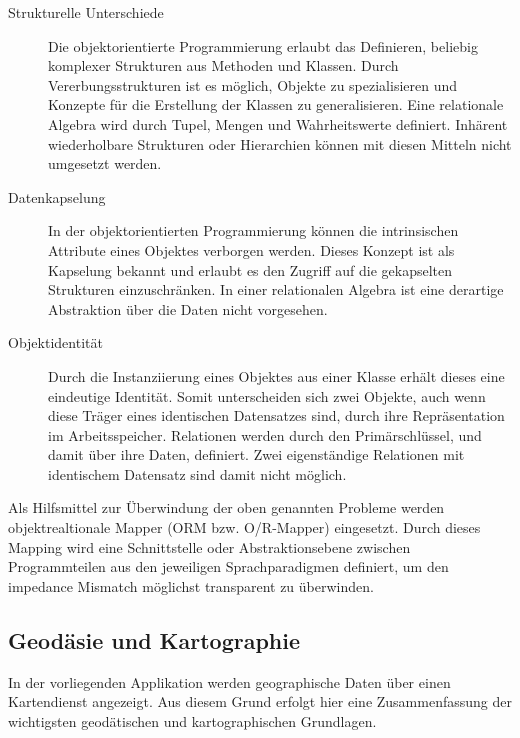 \begin{description}
 \item [Strukturelle Unterschiede]  
 Die objektorientierte Programmierung erlaubt das Definieren, beliebig komplexer Strukturen aus Methoden und Klassen. Durch Vererbungsstrukturen ist es möglich, Objekte zu spezialisieren und Konzepte für die Erstellung der Klassen zu generalisieren. Eine relationale Algebra wird durch Tupel, Mengen und Wahrheitswerte definiert. Inhärent wiederholbare Strukturen oder Hierarchien können mit diesen Mitteln nicht umgesetzt werden.   
 
 \item [Datenkapselung] 
 In der objektorientierten Programmierung können die intrinsischen Attribute eines Objektes verborgen werden. Dieses Konzept ist als Kapselung bekannt und erlaubt es den Zugriff auf die gekapselten Strukturen einzuschränken. In einer relationalen Algebra ist eine derartige Abstraktion über die Daten nicht vorgesehen.
 
 
 \item [Objektidentität]  
 Durch die Instanziierung eines Objektes aus einer Klasse erhält dieses eine eindeutige Identität. Somit unterscheiden sich zwei Objekte, auch wenn diese Träger eines identischen Datensatzes sind, durch ihre Repräsentation im Arbeitsspeicher. Relationen werden durch den Primärschlüssel, und damit über ihre Daten, definiert. Zwei eigenständige Relationen mit identischem Datensatz sind damit nicht möglich.
\end{description}


Als Hilfsmittel zur Überwindung der oben genannten Probleme werden objektrealtionale Mapper (ORM bzw. O/R-Mapper) eingesetzt. Durch dieses Mapping wird eine Schnittstelle oder Abstraktionsebene zwischen Programmteilen aus den jeweiligen Sprachparadigmen definiert, um den impedance Mismatch möglichst transparent zu überwinden.




    

\subsection{Geodäsie und Kartographie}

In der vorliegenden Applikation werden geographische Daten über einen Kartendienst angezeigt. Aus diesem Grund erfolgt hier eine Zusammenfassung der wichtigsten geodätischen und kartographischen Grundlagen.


